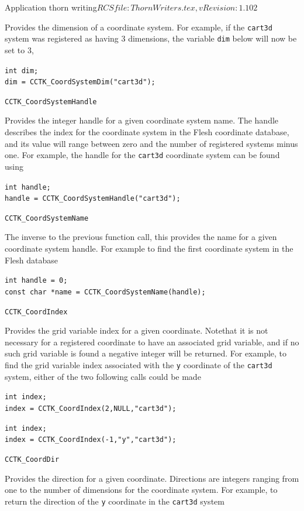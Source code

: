 \begin{cactuspart}{2}{Application thorn writing}{$RCSfile: ThornWriters.tex,v $}{$Revision: 1.102 $}
\begin{Lentry}
Provides the dimension of a coordinate system. For example, if
the {\tt cart3d} system was registered as having 3 dimensions, the
variable {\tt dim} below will now be set to 3,

{\tt int dim;\\
dim = CCTK\_CoordSystemDim("cart3d");
}

\item[{\tt CCTK\_CoordSystemHandle}]

Provides the integer handle for a given coordinate system name. The handle describes
the index for the coordinate system in the Flesh coordinate database, and its value
will range between zero and the number of registered systems minus one. For example,
the handle for the {\tt cart3d} coordinate system can be found using

{\tt int handle;\\
handle = CCTK\_CoordSystemHandle("cart3d");}

\item[{\tt CCTK\_CoordSystemName}]

The inverse to the previous function call, this provides the name for a given coordinate system handle.
For example to find the first coordinate system in the Flesh database

{\tt int handle = 0;\\
const char *name = CCTK\_CoordSystemName(handle);
}

\item[{\tt CCTK\_CoordIndex}]

Provides the grid variable index for a given coordinate. Notethat it is
not necessary for a registered coordinate to have an associated grid variable,
and if no such grid variable is found a negative integer will be returned.
For example, to find the grid variable index associated with the {\tt y}
coordinate of the {\tt cart3d} system, either of the two following
calls could be made

{\tt int index;\\
index = CCTK\_CoordIndex(2,NULL,"cart3d");}

{\tt int index;\\
index = CCTK\_CoordIndex(-1,"y","cart3d");}


\item[{\tt CCTK\_CoordDir}]

Provides the direction for a given coordinate. Directions are integers
ranging from one to the number of dimensions for the coordinate system.
For example, to return the direction of the {\tt y} coordinate in
the {\tt cart3d} system


\end{Lentry}
\end{cactuspart}
